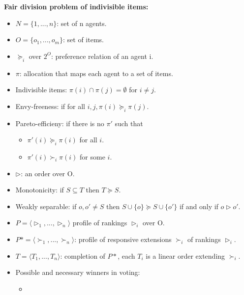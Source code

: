 \documentclass[12pt,a4paper]{article}
\begin{document}
\textbf{Fair division problem of indivisible items:}
\begin{itemize}
    \item $N = \{1, ..., n\}$: set of n agents.
    \item $O = \{o_1, ..., o_m\}$: set of items.
    \item $\succeq_i$ over $2^O$: preference relation of an agent i.
    \item $\pi$: allocation that maps each agent to a set of items.
    \item Indivisible items: $\pi(i) \cap \pi(j) = \emptyset$ for $i \neq j$.
    \item Envy-freeness: if for all $i,j, \pi(i) \succeq_i \pi(j)$.
    \item Pareto-efficieny: if there is no $\pi'$ such that
    \begin{itemize}
        \item $\pi'(i) \succeq_i \pi(i)$ for all $i$.
        \item $\pi'(i) \succ_i \pi(i)$ for some $i$.
    \end{itemize}
    \item $\triangleright$: an order over O.
    \item Monotonicity: if $S \subseteq T$ then $T \succeq S$.
    \item Weakly separable: if $o, o' \neq S$ then $S \cup \{o\} \succeq S \cup \{o'\}$ if and only if $o \triangleright o'$.
    \item $P = \langle \triangleright_1, ..., \triangleright_n \rangle$ profile of rankings $\triangleright_i$ over O.
    \item $P* = \langle \succ_1, ..., \succ_n \rangle$: profile of responsive extensions $\succ_i$ of rankings $\triangleright_i$.
    \item $T = \langle T_1, ..., T_n \rangle$: completion of $P*$, each $T_i$ is a linear order extending $\succ_i$.
\end{itemize}

\begin{itemize}
    \item Possible and necessary winners in voting:
    \begin{itemize}
        \item 
    \end{itemize}
\end{itemize}
\end{document}
